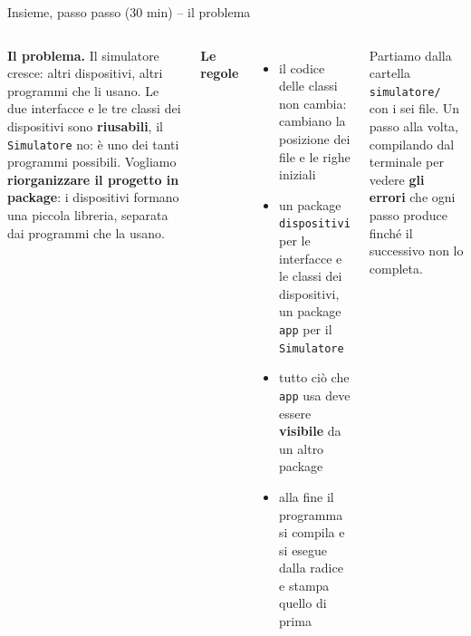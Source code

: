 \documentclass[10pt,aspectratio=169]{beamer}
\begin{document}
\begin{frame}[fragile]{Insieme, passo passo (30 min) -- il problema}
\begin{columns}[T]
\footnotesize
\textbf{Il problema.} Il simulatore cresce: altri dispositivi, altri programmi che li usano. Le due interfacce e le tre classi dei dispositivi sono \textbf{riusabili}, il \texttt{Simulatore} no: è uno dei tanti programmi possibili. Vogliamo \textbf{riorganizzare il progetto in package}: i dispositivi formano una piccola libreria, separata dai programmi che la usano.

\vspace{0.1cm}
\textbf{Le regole}
\begin{itemize}\itemsep=2pt
    \item il codice delle classi non cambia: cambiano la posizione dei file e le righe iniziali
    \item un package \texttt{dispositivi} per le interfacce e le classi dei dispositivi, un package \texttt{app} per il \texttt{Simulatore}
    \item tutto ciò che \texttt{app} usa deve essere \textbf{visibile} da un altro package
    \item alla fine il programma si compila e si esegue dalla radice e stampa quello di prima
\end{itemize}

\vspace{0.1cm}
Partiamo dalla cartella \texttt{simulatore/} con i sei file. Un passo alla volta, compilando dal terminale per vedere \textbf{gli errori} che ogni passo produce finché il successivo non lo completa.

\end{columns}
\end{frame}
\end{document}
